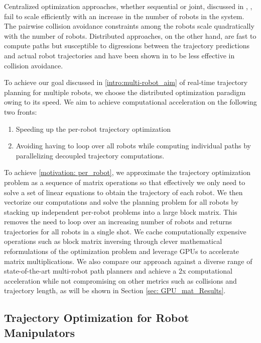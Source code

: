 Centralized optimization approaches, whether sequential or joint, discussed in \cite{chen2015decoupled}, \cite{incremental_scp_how}, fail to scale efficiently with an increase in the number of robots in the system. The pairwise collision avoidance constraints among the robots scale quadratically with the number of robots. Distributed approaches, on the other hand, are fast to compute paths but susceptible to digressions between the trajectory predictions and actual robot trajectories and have been shown in \cite{dmpc_carlos} to be less effective in collision avoidance. 

To achieve our goal discussed in \ref{intro:multi-robot_aim} of real-time trajectory planning for multiple robots, we choose the distributed optimization paradigm owing to its speed. We aim to achieve computational acceleration on the following two fronts:

\begin{enumerate}
    \item \label{motivation: per_robot} Speeding up the per-robot trajectory optimization 
    \item \label{motivation:parallelization} Avoiding having to loop over all robots while computing individual paths by parallelizing decoupled trajectory computations.
\end{enumerate}

To achieve \ref{motivation: per_robot}, we approximate the trajectory optimization problem as a sequence of matrix operations so that effectively we only need to solve a set of linear equations to obtain the trajectory of each robot. We then vectorize our computations and solve the planning problem for all robots by stacking up independent per-robot problems into a large block matrix. This removes the need to loop over an increasing number of robots and returns trajectories for all robots in a single shot. We cache computationally expensive operations such as block matrix inversing through clever mathematical reformulations of the optimization problem and leverage GPUs to accelerate matrix multiplications. We also compare our approach against a diverse range of state-of-the-art multi-robot path planners and achieve a 2x computational acceleration while not compromising on other metrics such as collisions and trajectory length, as will be shown in Section \ref{sec: GPU_mat_Results}.

\subsection{Trajectory Optimization for Robot Manipulators}


